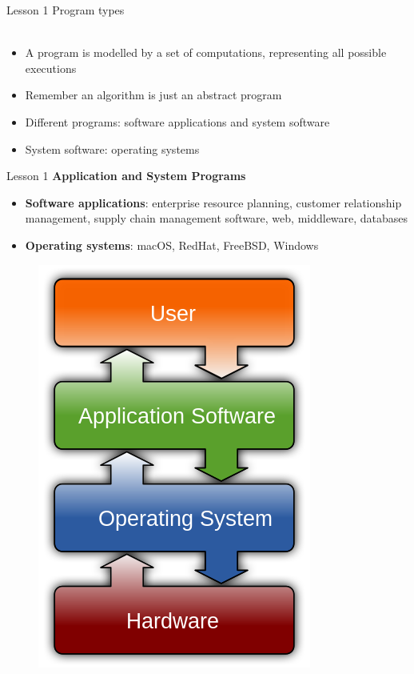 \documentclass[aspectratio=1610]{beamer}
\begin{document}
\begin{frame}{Lesson 1}{}
{\Huge{Program types}}\\~\\ 

\Large{
\begin{itemize}
    \item A program is modelled by a set of computations, representing all possible executions
    \item Remember an algorithm is just an abstract program
    \item Different programs: software applications and system software
    \item System software: operating systems
\end{itemize}}
\end{frame}


\begin{frame}{Lesson 1}{}
{\Large\textbf{{Application and System Programs}}}

\Large
\begin{minipage}{0.65\textwidth}
    \begin{itemize}
      \item \textbf{Software applications}:  enterprise resource planning, customer relationship management, supply chain management software, web, middleware, databases
      \item \textbf{Operating systems}: macOS, RedHat, FreeBSD, Windows
    \end{itemize}
  \end{minipage}
\begin{minipage}{0.30\textwidth}
      \begin{figure}
        \includegraphics[scale=0.32]{Images/OS}
      \end{figure}
  \end{minipage}
\end{frame}
\end{document}
